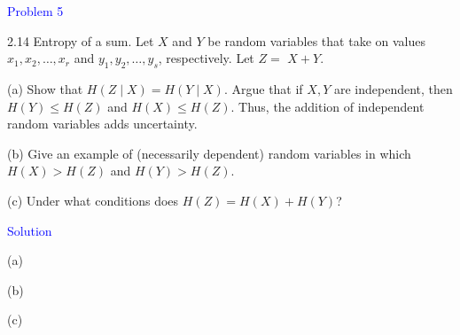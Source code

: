 \textcolor{blue}{Problem 5}

2.14 Entropy of a sum. Let $X$ and $Y$ be random variables that take on values $x_1, x_2, \ldots, x_r$ and $y_1, y_2, \ldots, y_s$, respectively. Let $Z=$ $X+Y$.

(a) Show that $H(Z \mid X)=H(Y \mid X)$. Argue that if $X, Y$ are independent, then $H(Y) \leq H(Z)$ and $H(X) \leq H(Z)$. Thus, the addition of independent random variables adds uncertainty.

(b) Give an example of (necessarily dependent) random variables in which $H(X)>H(Z)$ and $H(Y)>H(Z)$.

(c) Under what conditions does $H(Z)=H(X)+H(Y)$?

\textcolor{blue}{Solution}

(a)



(b)



(c)



